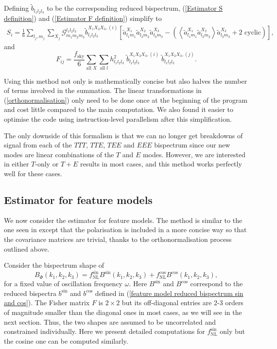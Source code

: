Defining $\tilde{b}_{l_1 l_2 l_3}$ to be the corresponding reduced bispectrum, (\ref{Estimator S definition}) and (\ref{Estimator F definition}) simplify to
\begin{eqnarray}
	S_i =  \frac{1}{6} \sum_{l_j, m_j} \sum_{X_j} \mathcal{G}_{m_1 m_2 m_3}^{l_1 l_2 l_3} \tilde{b}_{l_1 l_2 l_3} ^{X_1 X_2 X_3, (i)} \left[ \tilde{a}_{l_1 m_1}^{X_1} \tilde{a}_{l_2 m_2}^{X_2} \tilde{a}_{l_3 m_3}^{X_3} -  \left( \left< \tilde{a}_{l_1 m_1}^{X_1} \tilde{a}_{l_2 m_2}^{X_2} \right> \tilde{a}_{l_3 m_3}^{X_3} + \text{2 cyclic} \right)   \right],
	\label{KSW estimator S after orthonormalisation}
\end{eqnarray}
and
\begin{equation}
	F_{ij}= \frac{f_\text{sky}}{6} \sum_{\text{all }X} \sum_{\text{all }l} h_{l_1 l_2 l_3}^2 \; \tilde{b}_{l_1 l_2 l_3}^{X_1 X_2 X_3, (i)} \; \tilde{b}_{l_1 l_2 l_3}^{X_1 X_2 X_3, (j)}.
	\label{KSW estimator F after orthonormalisation}
\end{equation}

Using this method not only is mathematically concise but also halves the number of terms involved in the summation. The linear transformations in (\ref{orthonormalisation}) only need to be done once at the beginning of the program and cost little compared to the main computation. We also found it easier to optimise the code using instruction-level parallelism after this simplification.

The only downside of this formalism is that we can no longer get breakdowns of signal from each of the $TTT$, $TTE$, $TEE$ and $EEE$ bispectrum since our new modes are linear combinations of the $T$ and $E$ modes. However, we are interested in either $T$-only or $T+E$ results in most cases, and this method works perfectly well for these cases.

\subsection{Estimator for feature models}

We now consider the estimator for feature models. The method is similar to the one seen in \cite{Munchmeyer2014} except that the polarisation is included in a more concise way so that the covariance matrices are trivial, thanks to the orthonormalisation process outlined above.

Consider the bispectrum shape of
\begin{equation}
	B_\Phi (k_1, k_2, k_3) = f_\text{NL}^{\sin} B^{\sin}(k_1, k_2, k_3) + f_\text{NL}^{\cos} B^{\cos}(k_1, k_2, k_3),
\end{equation}
for a fixed value of oscillation frequency $\omega$. Here $B^{\sin}$ and $B^{\cos}$ correspond to the reduced bispectra $b^{\sin}$ and $b^{\cos}$ defined in (\ref{feature model reduced bispectrum sin and cos}). The Fisher matrix $F$ is $2\times2$ but its off-diagonal entries are 2-3 orders of magnitude smaller than the diagonal ones in most cases, as we will see in the next section. Thus, the two shapes are assumed to be uncorrelated and constrained individually. Here we present detailed computations for $f_\text{NL}^{\sin}$ only but the cosine one can be computed similarly.

